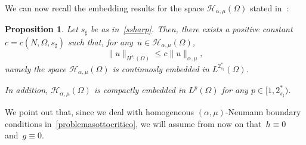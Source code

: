 \documentclass[12pt,a4paper,intlimits,sumlimits]{amsart}
\theoremstyle{definition}
\theoremstyle{plain}
\newtheorem{proposition}[definition]{Proposition}
\numberwithin{equation}{section}
\renewcommand{\le}{\leqslant}
\begin{document}
We can now recall the embedding results for the space $\mathcal H_{\alpha, \mu} (\Omega)$ stated in~\cite[Proposition~2.4 and Corollary~2.5]{TUTTI}:

\begin{proposition}\label{embeddings}
Let $s_\sharp$ be as in~\eqref{ssharp}. Then, there exists a positive constant~$c=c(N, \Omega, s_\sharp)$ such that, for any~$u\in\mathcal H_{\alpha,\mu}(\Omega)$, 
\[
\|u\|_{H^{s_\sharp}(\Omega)}\le c \|u\|_{\alpha, \mu},
\]
namely the space $\mathcal H_{\alpha,\mu}(\Omega)$ is continuosly embedded in $L^{2^*_{s_\sharp}}(\Omega)$. 

In addition, $\mathcal H_{\alpha,\mu}(\Omega)$ is compactly embedded in $L^p(\Omega)$ for any $p\in [1,  2^*_{s_\sharp})$.
\end{proposition}

We point out that, since we deal with homogeneous $(\alpha,\mu)$-Neumann boundary conditions in~\eqref{problemasottocritico},
we will assume from now on that~$h\equiv0$ and~$g\equiv0$.
\end{document}
